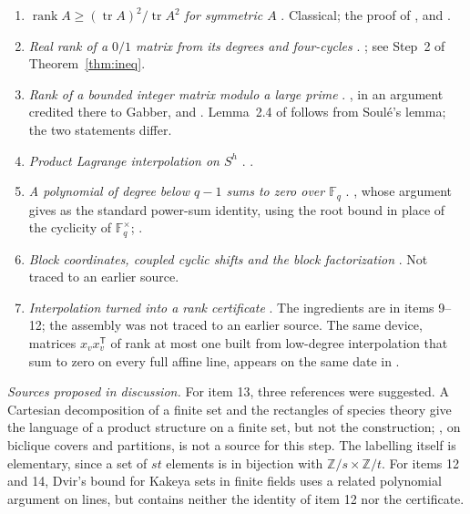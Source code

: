 \documentclass[11pt]{article}
\theoremstyle{definition}
\theoremstyle{remark}
\numberwithin{equation}{section}
\DeclareMathOperator{\rank}{rank}
\DeclareMathOperator{\tr}{tr}
\newcommand{\F}{\mathbb F}
\newcommand{\Z}{\mathbb Z}
\begin{document}
{\begin{enumerate}[label=\arabic*.,leftmargin=*,itemsep=2pt]
\item \emph{$\rank A\ge(\tr A)^2/\tr A^2$ for symmetric $A$} \cite[Section~2.4]{OAI252}. Classical; the proof of \cite[Lemma~2.2]{Alon2009}, and \cite[Section~3]{AHKPY2011}.
\item \emph{Real rank of a $0/1$ matrix from its degrees and four-cycles} \cite[(2.8)--(2.9) and the display after them]{OAI252}. \cite[Theorem~6]{AHKPY2011}; see Step~2 of Theorem~\ref{thm:ineq}.
\item \emph{Rank of a bounded integer matrix modulo a large prime} \cite[Lemma~2.4]{OAI252}. \cite[Lemma~1]{Soule1999}, in an argument credited there to Gabber, and \cite[Lemma~3.1]{Sauer2016}. Lemma~2.4 of \cite{OAI252} follows from Soul\'e's lemma; the two statements differ.
\item \emph{Product Lagrange interpolation on $S^h$} \cite[Section~2.5]{OAI252}. \cite[Lemma~1.3 and Theorem~2.3]{Schauz2008}.
\item \emph{A polynomial of degree below $q-1$ sums to zero over $\F_q$} \cite[(2.13)]{OAI252}. \cite[Chapter~I, \S2.1, Lemma]{Serre1973}, whose argument \cite{OAI252} gives as the standard power-sum identity, using the root bound in place of the cyclicity of $\F_q^\times$; \cite[Theorem~3.3(i)]{Schauz2008}.
\item \emph{Block coordinates, coupled cyclic shifts and the block factorization} \cite[(2.3)--(2.5), (2.11)]{OAI252}. Not traced to an earlier source.
\item \emph{Interpolation turned into a rank certificate} \cite[(2.13)--(2.14)]{OAI252}. The ingredients are in items 9--12; the assembly was not traced to an earlier source. The same device, matrices $x_vx_v^{\mathsf T}$ of rank at most one built from low-degree interpolation that sum to zero on every full affine line, appears on the same date in \cite[Lemma~2.2 and Proposition~2.3]{OAIdf2}.
\end{enumerate}

\emph{Sources proposed in discussion.} For item 13, three references were suggested. A Cartesian decomposition of a finite set \cite[Definition~2.1, Theorem~3.3]{BPS2003} and the rectangles of species theory \cite[Definitions~2.1 and~2.2]{MaiaMendez2008} give the language of a product structure on a finite set, but not the construction; \cite[Theorem~4]{Pinto2014}, on biclique covers and partitions, is not a source for this step. The labelling itself is elementary, since a set of $st$ elements is in bijection with $\Z/s\times\Z/t$. For items 12 and 14, Dvir's bound for Kakeya sets in finite fields \cite[Theorem~3]{Dvir2009} uses a related polynomial argument on lines, but contains neither the identity of item 12 nor the certificate.
}
\end{document}
